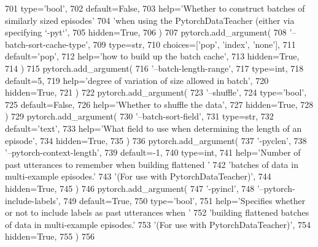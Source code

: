 \begin{DoxyCode}
701             type=\textcolor{stringliteral}{'bool'},
702             default=\textcolor{keyword}{False},
703             help=\textcolor{stringliteral}{'Whether to construct batches of similarly sized episodes'}
704             \textcolor{stringliteral}{'when using the PytorchDataTeacher (either via specifying `-pyt`'},
705             hidden=\textcolor{keyword}{True},
706         )
707         pytorch.add\_argument(
708             \textcolor{stringliteral}{'--batch-sort-cache-type'},
709             type=str,
710             choices=[\textcolor{stringliteral}{'pop'}, \textcolor{stringliteral}{'index'}, \textcolor{stringliteral}{'none'}],
711             default=\textcolor{stringliteral}{'pop'},
712             help=\textcolor{stringliteral}{'how to build up the batch cache'},
713             hidden=\textcolor{keyword}{True},
714         )
715         pytorch.add\_argument(
716             \textcolor{stringliteral}{'--batch-length-range'},
717             type=int,
718             default=5,
719             help=\textcolor{stringliteral}{'degree of variation of size allowed in batch'},
720             hidden=\textcolor{keyword}{True},
721         )
722         pytorch.add\_argument(
723             \textcolor{stringliteral}{'--shuffle'},
724             type=\textcolor{stringliteral}{'bool'},
725             default=\textcolor{keyword}{False},
726             help=\textcolor{stringliteral}{'Whether to shuffle the data'},
727             hidden=\textcolor{keyword}{True},
728         )
729         pytorch.add\_argument(
730             \textcolor{stringliteral}{'--batch-sort-field'},
731             type=str,
732             default=\textcolor{stringliteral}{'text'},
733             help=\textcolor{stringliteral}{'What field to use when determining the length of an episode'},
734             hidden=\textcolor{keyword}{True},
735         )
736         pytorch.add\_argument(
737             \textcolor{stringliteral}{'-pyclen'},
738             \textcolor{stringliteral}{'--pytorch-context-length'},
739             default=-1,
740             type=int,
741             help=\textcolor{stringliteral}{'Number of past utterances to remember when building flattened '}
742             \textcolor{stringliteral}{'batches of data in multi-example episodes.'}
743             \textcolor{stringliteral}{'(For use with PytorchDataTeacher)'},
744             hidden=\textcolor{keyword}{True},
745         )
746         pytorch.add\_argument(
747             \textcolor{stringliteral}{'-pyincl'},
748             \textcolor{stringliteral}{'--pytorch-include-labels'},
749             default=\textcolor{keyword}{True},
750             type=\textcolor{stringliteral}{'bool'},
751             help=\textcolor{stringliteral}{'Specifies whether or not to include labels as past utterances when '}
752             \textcolor{stringliteral}{'building flattened batches of data in multi-example episodes.'}
753             \textcolor{stringliteral}{'(For use with PytorchDataTeacher)'},
754             hidden=\textcolor{keyword}{True},
755         )
756 
\end{DoxyCode}
